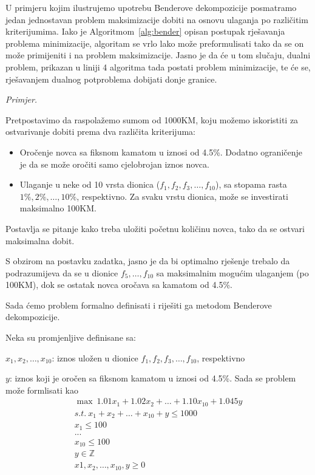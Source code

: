 \documentclass[a4paper, utf8, 11pt, colorlinks]{book}
\begin{document}
U primjeru kojim ilustrujemo upotrebu Benderove dekompozicije posmatramo jedan jednostavan problem maksimizacije dobiti na osnovu ulaganja po različitim kriterijumima.
Iako je Algoritmom~\ref{alg:bender} opisan postupak rješavanja problema minimizacije, algoritam se vrlo lako može preformulisati tako da se on može primijeniti i na problem maksimizacije. Jasno je da će u tom slučaju, dualni problem, prikazan u liniji 4 algoritma tada postati problem minimizacije, te će se, rješavanjem dualnog potproblema dobijati donje granice.


\emph{Primjer.} 

Pretpostavimo da raspolažemo sumom od 1000KM, koju možemo iskoristiti za ostvarivanje dobiti prema dva različita kriterijuma:
\begin{itemize}
	\item Oročenje novca sa fiksnom kamatom u iznosi od 4.5\%. Dodatno ograničenje je da se može oročiti samo cjelobrojan iznos novca.
	
	\item Ulaganje u neke od 10 vrsta dionica ($f_1, f_2, f_3,\ldots,f_{10}$), sa stopama rasta $1\%,2\%,\ldots,10\%$, respektivno. Za svaku vrstu dionica, može se investirati maksimalno 100KM.
\end{itemize}
Postavlja se pitanje kako treba uložiti početnu količinu novca, tako da se ostvari maksimalna dobit.

S obzirom na postavku zadatka, jasno je da bi optimalno rješenje trebalo da podrazumijeva da se u dionice $f_5,\ldots,f_{10}$ sa maksimalnim mogućim ulaganjem (po 100KM), dok se ostatak novca oročava sa kamatom od  4.5\%.

Sada ćemo problem formalno definisati i riješiti ga metodom Benderove dekompozicije.

Neka su promjenljive definisane sa:

$x_1,x_2,\ldots,x_{10}$: iznos uložen u dionice $f_1, f_2, f_3,\ldots,f_{10}$, respektivno

$y$: iznos koji je oročen sa fiksnom kamatom u iznosi od 4.5\%. Sada se problem može formlisati kao
\begin{equation}\label{primer:formulacija1}
	\begin{aligned}
		\max\ 1.01x_1+1.02x_2+\ldots+1.10x_{10}+1.045y\\
		s.t.\ x_1+x_2+\ldots+x_{10}+y\leqslant1000\\
		x_1\leqslant 100\\
		...\\
		x_{10}\leqslant 100\\
		y\in \mathbb{Z}\\
		x1,x_2,\ldots,x_{10},y\geqslant 0
	\end{aligned}
\end{equation}
\end{document}
